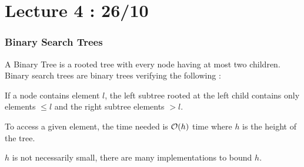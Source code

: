 \documentclass[12pt]{cours}
\begin{document}
\part[Integer Sets]{Lecture 4 : 26/10}
\localtableofcontents
\section{Binary Search Trees}
\begin{definition}
    A Binary Tree is a rooted tree with every node having at most two children. Binary search trees are binary trees verifying the following :
    \begin{center}
        If a node contains element $l$, the left subtree rooted at the left child contains only elements $\leq l$ and the right subtree elements $> l$.
    \end{center}
\end{definition}

\begin{proposition}
    To access a given element, the time needed is $\mathcal{O}(h)$ time where $h$ is the height of the tree.
\end{proposition}
$h$ is not necessarily small, there are many implementations to bound $h$.
\end{document}

